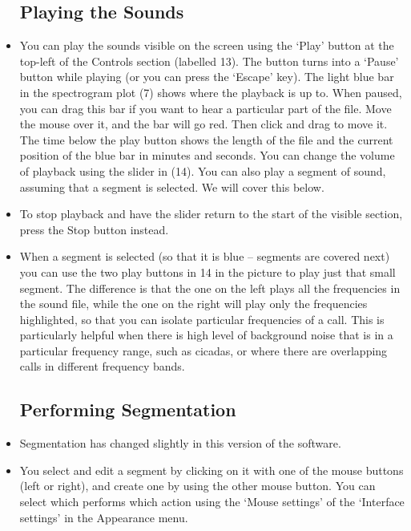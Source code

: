 \documentclass{article}
\begin{document}
\begin{itemize}
\subsection{Playing the Sounds \label{sec:play}}

\item You can play the sounds visible on the screen using the `Play' button at the top-left of the Controls section (labelled 13). The button turns into a `Pause' button while playing (or you can press the `Escape' key). The light blue bar in the spectrogram plot (7)  shows where the playback is up to. When paused, you can drag this bar if you want to hear a particular part of the file. Move the mouse over it, and the bar will go red. Then click and drag to move it. The time below the play button shows the length of the file and the current position of the blue bar in minutes and seconds. You can change the volume of playback using the slider in (14). 
You can also play a segment of sound, assuming that a segment is selected. We will cover this below.

\item To stop playback and have the slider return to the start of the visible section, press the Stop button instead.

\item When a segment is selected (so that it is blue -- segments are covered next) you can use the two play buttons in 14 in the picture to play just that small segment. The difference is that the one on the left plays all the frequencies in the sound file, while the one on the right will play only the frequencies highlighted, so that you can isolate particular frequencies of a call. This is particularly helpful when there is high level of background noise that is in a particular frequency range, such as cicadas, or where there are overlapping calls in different frequency bands.

\subsection{Performing Segmentation}

\item Segmentation has changed slightly in this version of the software. 

\item You select and edit a segment by clicking on it with one of the mouse buttons (left or right), and create one by using the other mouse button. You can select which performs which action using the `Mouse settings' of the `Interface settings' in the Appearance menu.


\end{itemize}
\end{document}
